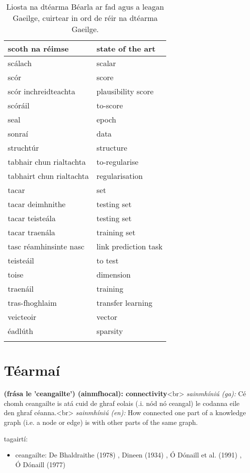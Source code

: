 \documentclass{article}
\begin{document}
\begin{longtable}{|l|l|}
		scoth na réimse&state of the art\\ \hline 
		scálach&scalar\\ \hline 
		scór&score\\ \hline 
		scór inchreidteachta&plausibility score\\ \hline 
		scóráil&to-score\\ \hline 
		seal&epoch\\ \hline 
		sonraí&data\\ \hline 
		struchtúr&structure\\ \hline 
		tabhair chun rialtachta&to-regularise\\ \hline 
		tabhairt chun rialtachta&regularisation\\ \hline 
		tacar&set\\ \hline 
		tacar deimhnithe&testing set\\ \hline 
		tacar teisteála&testing set\\ \hline 
		tacar traenála&training set\\ \hline 
		tasc réamhinsinte nasc&link prediction task\\ \hline 
		teisteáil&to test\\ \hline 
		toise&dimension\\ \hline 
		traenáil&training\\ \hline 
		tras-fhoghlaim&transfer learning\\ \hline 
		veicteoir&vector\\ \hline 
		éadlúth&sparsity\\ \hline 
\caption{Liosta na dtéarma Béarla ar fad agus a leagan Gaeilge, cuirtear in ord de réir na dtéarma Gaeilge.}
\label{tab-terms-ga-en}
\end{longtable}

\section{Téarmaí}
\textbf{(frása le 'ceangailte') (ainmfhocal): connectivity}<br>
\textit{sainmhíniú (ga):} Cé chomh ceangailte is atá cuid de ghraf eolais (.i. nód nó ceangal) le codanna eile den ghraf céanna.<br>
\textit{sainmhíniú (en):} How connected one part of a knowledge graph (i.e. a node or edge) is with other parts of the same graph.

tagairtí:
\begin{itemize}
	\item ceangailte: De Bhaldraithe (1978) \cite{de-bhaldraithe}, Dineen (1934) \cite{dineen}, Ó Dónaill et al. (1991) \cite{focloir-beag}, Ó Dónaill (1977) \cite{odonaill}
\end{itemize}
\end{document}
